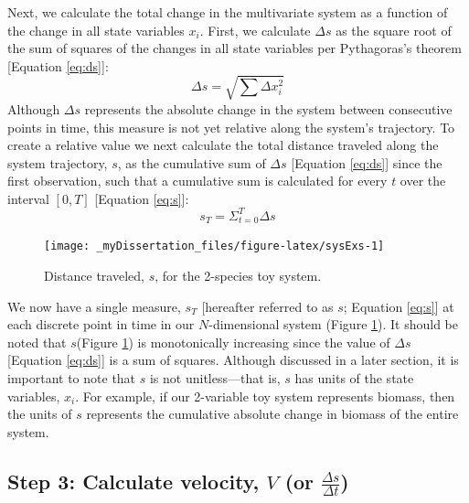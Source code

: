 \documentclass[12pt,twoside,openany]{reedthesis}
\begin{document}
Next, we calculate the total change in the multivariate system as a function of the change in all state variables \(x_i\). First, we calculate \(\Delta s\) as the square root of the sum of squares of the changes in all state variables per Pythagoras's theorem {[}Equation \eqref{eq:ds}{]}:
\begin{equation}
\Delta s = \sqrt{\sum{\Delta x_i^2}}
\label{eq:ds}
\end{equation}
Although \(\Delta s\) represents the absolute change in the system between consecutive points in time, this measure is not yet relative along the system's trajectory. To create a relative value we next calculate the total distance traveled along the system trajectory, \(s\), as the cumulative sum of \(\Delta s\) {[}Equation \eqref{eq:ds}{]} since the first observation, such that a cumulative sum is calculated for every \(t\) over the interval \([0,T]\) {[}Equation \eqref{eq:s}{]}:
\begin{equation}
s_T = \Sigma_{t=0}^{T}{\Delta s}
  \label{eq:s}
\end{equation}
\begin{figure}[bth]

{\centering \texttt{[image: \_myDissertation\_files/figure-latex/sysExs-1]} 

}

\caption{Distance traveled, $s$, for the 2-species toy system.}\label{fig:sysExs}
\end{figure}
We now have a single measure, \(s_T\) {[}hereafter referred to as \(s\); Equation \eqref{eq:s}{]} at each discrete point in time in our \(N\)-dimensional system (Figure \ref{fig:sysExs}). It should be noted that \(s\)(Figure \ref{fig:sysExs}) is monotonically increasing since the value of \(\Delta s\) {[}Equation \eqref{eq:ds}{]} is a sum of squares. Although discussed in a later section, it is important to note that \(s\) is not unitless---that is, \(s\) has units of the state variables, \(x_i\). For example, if our 2-variable toy system represents biomass, then the units of \(s\) represents the cumulative absolute change in biomass of the entire system.

\hypertarget{step-3-calculate-velocity-v-or-fracdelta-sdelta-t}{%
\subsection{\texorpdfstring{Step 3: Calculate velocity, \(V\) (or \(\frac{\Delta s}{\Delta t}\))}{Step 3: Calculate velocity, V (or \textbackslash frac\{\textbackslash Delta s\}\{\textbackslash Delta t\})}}\label{step-3-calculate-velocity-v-or-fracdelta-sdelta-t}}
\end{document}
